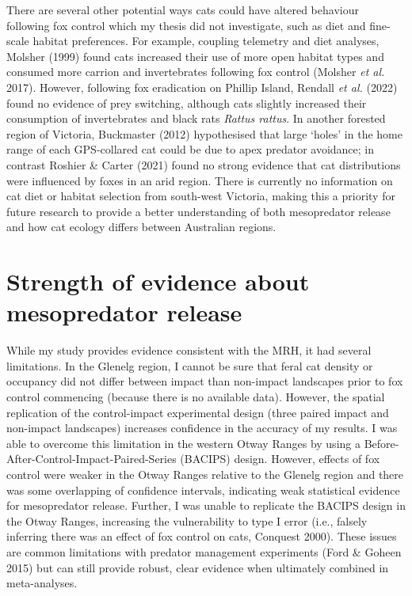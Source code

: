 \documentclass[11pt,a4paper,titlepage,twoside,openright]{style/unimelbthesis}
\begin{document}
\begin{mainmatter}
There are several other potential ways cats could have altered behaviour following fox control which my thesis did not investigate, such as diet and fine-scale habitat preferences. For example, coupling telemetry and diet analyses, Molsher (1999) found cats increased their use of more open habitat types and consumed more carrion and invertebrates following fox control (Molsher \emph{et al.} 2017). However, following fox eradication on Phillip Island, Rendall \emph{et al.} (2022) found no evidence of prey switching, although cats slightly increased their consumption of invertebrates and black rats \emph{Rattus rattus}. In another forested region of Victoria, Buckmaster (2012) hypothesised that large `holes' in the home range of each GPS-collared cat could be due to apex predator avoidance; in contrast Roshier \& Carter (2021) found no strong evidence that cat distributions were influenced by foxes in an arid region. There is currently no information on cat diet or habitat selection from south-west Victoria, making this a priority for future research to provide a better understanding of both mesopredator release and how cat ecology differs between Australian regions.

\hypertarget{strength-of-evidence-about-mesopredator-release}{%
\section{Strength of evidence about mesopredator release}\label{strength-of-evidence-about-mesopredator-release}}

While my study provides evidence consistent with the MRH, it had several limitations. In the Glenelg region, I cannot be sure that feral cat density or occupancy did not differ between impact than non-impact landscapes prior to fox control commencing (because there is no available data). However, the spatial replication of the control-impact experimental design (three paired impact and non-impact landscapes) increases confidence in the accuracy of my results. I was able to overcome this limitation in the western Otway Ranges by using a Before-After-Control-Impact-Paired-Series (BACIPS) design. However, effects of fox control were weaker in the Otway Ranges relative to the Glenelg region and there was some overlapping of confidence intervals, indicating weak statistical evidence for mesopredator release. Further, I was unable to replicate the BACIPS design in the Otway Ranges, increasing the vulnerability to type I error (i.e., falsely inferring there was an effect of fox control on cats, Conquest 2000). These issues are common limitations with predator management experiments (Ford \& Goheen 2015) but can still provide robust, clear evidence when ultimately combined in meta-analyses.


\end{mainmatter}
\end{document}
